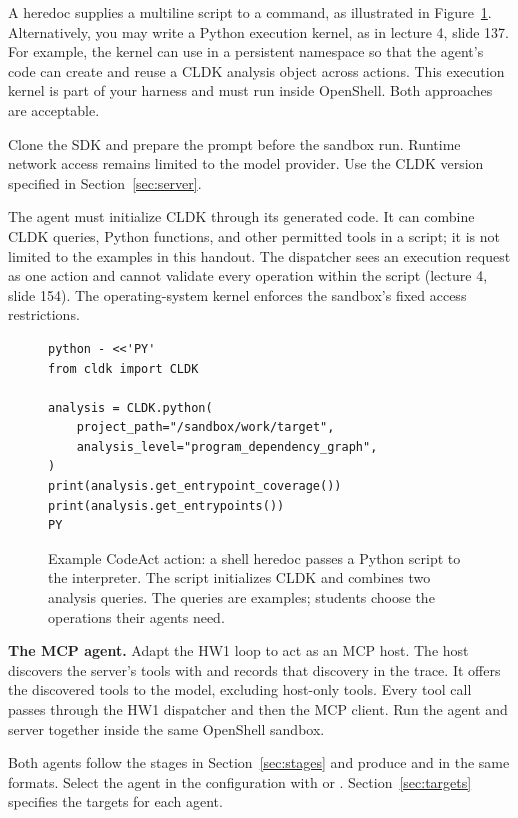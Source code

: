 \documentclass[9pt,letterpaper]{article}
\begin{document}
A heredoc supplies a multiline script to a command, as illustrated in
Figure~\ref{fig:kernel}. Alternatively, you may write a Python execution kernel,
as in lecture 4, slide 137. For example, the kernel can use  in a
persistent namespace so that the agent's code can create and reuse a CLDK analysis
object across actions. This execution kernel is part of your harness and must run
inside OpenShell. Both approaches are acceptable.

Clone the SDK and prepare the prompt before the sandbox run. Runtime network
access remains limited to the model provider. Use the CLDK version specified in
Section~\ref{sec:server}.

The agent must initialize CLDK through its generated code. It can combine CLDK
queries, Python functions, and other permitted tools in a script; it is not
limited to the examples in this handout. The dispatcher sees an execution request
as one action and cannot validate every operation within the script
(lecture 4, slide 154). The operating-system kernel enforces the sandbox's fixed
access restrictions.

\begin{figure}[htbp]
\begin{verbatim}
python - <<'PY'
from cldk import CLDK

analysis = CLDK.python(
    project_path="/sandbox/work/target",
    analysis_level="program_dependency_graph",
)
print(analysis.get_entrypoint_coverage())
print(analysis.get_entrypoints())
PY
\end{verbatim}
\caption{Example CodeAct action: a shell heredoc passes a Python script to the
interpreter. The script initializes CLDK and combines two analysis queries.
The queries are examples; students choose the operations their agents need.}\label{fig:kernel}
\end{figure}

\textbf{The MCP agent.} Adapt the HW1 loop to act as an MCP host. The host
discovers the server's tools with  and records that discovery in
the trace. It offers the discovered tools to the model, excluding host-only
tools. Every tool call passes through the HW1 dispatcher and then the MCP client.
Run the agent and server together inside the same OpenShell sandbox.

Both agents follow the stages in Section~\ref{sec:stages} and produce
 and  in the same formats. Select the agent
in the configuration with  or .
Section~\ref{sec:targets} specifies the targets for each agent.
\end{document}
